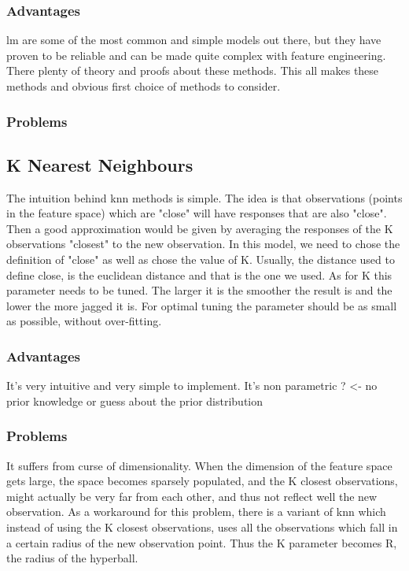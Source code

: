 \subsubsection{Advantages}
\acrlong{lm} are some of the most common and simple models out there, but they have proven to be reliable and can be made quite complex with feature engineering. There plenty of theory and proofs about these methods. This all makes these methods and obvious first choice of methods to consider.
\subsubsection{Problems}


\subsection{K Nearest Neighbours}
The intuition behind \acrshort{knn} methods is simple. The idea is that observations (points in the feature space) which are "close" will have responses that are also "close". Then a good approximation would be given by averaging the responses of the K observations "closest" to the new observation.
In this model, we need to chose the definition of "close" as well as chose the value of K.
Usually, the distance used to define close, is the euclidean distance and that is the one we used. As for K this parameter needs to be tuned. The larger it is the smoother the result is and the lower the more jagged it is. For optimal tuning the parameter should be as small as possible, without over-fitting.
\subsubsection{Advantages}
It's very intuitive and very simple to implement. 
It's non parametric ? <- no prior knowledge or guess about the prior distribution
\subsubsection{Problems}
It suffers from curse of dimensionality. When the dimension of the feature space gets large, the space becomes sparsely populated, and the K closest observations, might actually be very far from each other, and thus not reflect well the new observation.
As a workaround for this problem, there is a variant of \acrshort{knn} which instead of using the K closest observations, uses all the observations which fall in a certain radius of the new observation point. Thus the K parameter becomes R, the radius of the hyperball.

